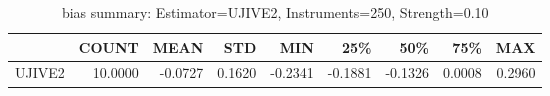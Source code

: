 \begin{table}[ht]
\centering
\caption{bias summary: Estimator=UJIVE2, Instruments=250, Strength=0.10}
\begin{tabular}{lrrrrrrrr}
\toprule
 & COUNT & MEAN & STD & MIN & 25\% & 50\% & 75\% & MAX \\
\midrule
UJIVE2 & 10.0000 & -0.0727 & 0.1620 & -0.2341 & -0.1881 & -0.1326 & 0.0008 & 0.2960 \\
\bottomrule
\end{tabular}
\end{table}
